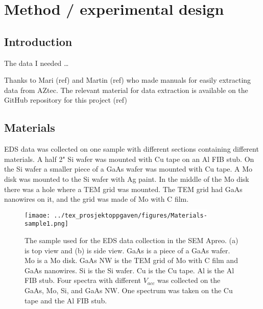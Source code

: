 \chapter{Method / experimental design}
\label{chap:method}



%
%
\section{Introduction}
\label{sec:method:intro}
The data I needed \dots


Thanks to Mari (ref) and Martin (ref) who made manuals for easily extracting data from AZtec.
The relevant material for data extraction is available on the GitHub repository for this project (ref)


%
%
\section{Materials}
\label{sec:method:materials}
EDS data was collected on one sample with different sections containing different materials.
A half 2" Si wafer was mounted with Cu tape on an Al FIB stub.
On the Si wafer a smaller piece of a GaAs wafer was mounted with Cu tape.
A Mo disk was mounted to the Si wafer with Ag paint.
In the middle of the Mo disk there was a hole where a TEM grid was mounted.
The TEM grid had GaAs nanowires on it, and the grid was made of Mo with C film.

\begin{figure}[ht]
    \centering
    \colorbox{white}{\texttt{[image: ../tex\_prosjektoppgaven/figures/Materials-sample1.png]}}
    \caption{
        The sample used for the EDS data collection in the SEM Apreo.
        (a) is top view and (b) is side view.
        GaAs is a piece of a GaAs wafer.
        Mo is a Mo disk.
        GaAs NW is the TEM grid of Mo with C film and GaAs nanowires.
        Si is the Si wafer.
        Cu is the Cu tape.
        Al is the Al FIB stub.
        Four spectra with different $V_{acc}$ was collected on the GaAs, Mo, Si, and GaAs NW.
        One spectrum was taken on the Cu tape and the Al FIB stub.
    }
    \label{fig:method:materials:sample1}
\end{figure}



